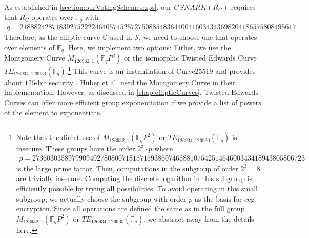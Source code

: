 As established in \cref{section:ourVotingSchemes:zps}, our $GSNARK(R_C)$ requires that $R_C$ operates over $\mathbb{F}_q$ with 
\begin{align*}
    \scriptstyle q = 21888242871839275222246405745257275088548364400416034343698204186575808495617\text{.}
\end{align*}
Therefore, as the elliptic curve $\mathbb{G}$ used in $\mathcal{S}$, we need to choose one that operates over elements of $\mathbb{F}_q$.
Here, we implement two options: 
Either, we use the Montgomery Curve $M_{126932, 1}(\mathbb{F}_qP^2)$ or the isomorphic Twisted Edwards Curve $TE_{126934, 126930}(\mathbb{F}_q)$.\footnote{
    \label{footnote:ellipticCurveSubgroup}
    Note that the direct use of $M_{126932, 1}(\mathbb{F}_qP^2)$ or $TE_{126934, 126930}(\mathbb{F}_q)$ is insecure.
    These groups have the order $2^3\cdot p$ where
    \begin{align*}
        \scriptstyle p = 2736030358979909402780800718157159386074658810754251464600343418943805806723
    \end{align*}
    is the large prime factor.
    Then, computations in the subgroup of order $2^3=8$ are trivially insecure.
    Computing the discrete logarithm in this subgroup is efficiently possible by trying all possibilities.
    To avoid operating in this small subgroup, we actually choose the subgroup with order $p$ as the basis for \gls{eeg} encryption.
    Since all operations are defined the same as in the full group $M_{126932, 1}(\mathbb{F}_qP^2)$ or $TE_{126934, 126930}(\mathbb{F}_q)$, we abstract away from the details here.
}
This curve is an instantiation of Curve25519 \cite{yung_curve25519_2006} and provides about $125$-bit security \cite{kosba_cc_2015}.
Huber et al. \cite{huber_zk-snarks_2025} used the Montgomery Curve in their implementation.
However, as discussed in \cref{chap:ellipticCurves}, Twisted Edwards Curves can offer more efficient group exponentiation if we provide a list of powers of the element to exponentiate.


